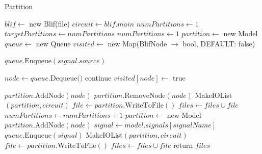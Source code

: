 \documentclass[12pt,final,oneside]{dwThesis} %
\begin{document}
   \begin{algorithm}
      \caption{Partition}\label{partition}

      \begin{algorithmic}[1]
         \State $blif \gets$
         new Blif(file)  
         \State $circuit \gets
         blif.main$ 
         \State $numPartitions \gets 1$
	\Repeat
		\State $targetPartitions \gets numPartitions$
		\State $numPartitions \gets 1$
	         \State
	         $partition \gets$ new Model  
	         \State $queue
	         \gets$ new Queue  
	         \State $visited \gets$ new
	         Map(BlifNode $\to$ bool, DEFAULT: false)
	
	         \State
	         $queue.\mbox{Enqueue}(signal.source)$ \EndFor
	
	         \State $node \gets queue.\mbox{Dequeue()}$
	         \State continue  \EndIf 
	         \State $visited[node] \gets $ true
	
	         \State $partition.\mbox{AddNode}(node)$
	         \State
	         $partition.\mbox{RemoveNode}(node)$ 
	         \State MakeIOList$(partition,
	         circuit)$ 
	         \State $file \gets partition.\mbox{WriteToFile}()$ 
	         \State
	         $files \gets files\cup file$ 
	         \State $numPartitions \gets
	         numPartitions+1$ 
	         \State $partition \gets$ new Model  
	         \State $partition.\mbox{AddNode}(node)$ \EndIf
	         \State $signal \gets
	         model.signals[signalName]$ 
	         \State $queue.\mbox{Enqueue}(signal)$
	         \EndFor
	         \EndWhile
	         \State
	         MakeIOList$(partition, circuit)$ 
	         \State $file \gets
	         partition.\mbox{WriteToFile}()$ 
	         \State $files \gets files\cup file$
	         \EndIf
         \State return $files$ \EndProcedure 
      \end{algorithmic}


   \end{algorithm}
\end{document}

